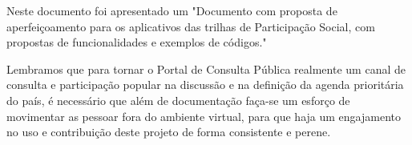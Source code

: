 \documentclass[12pt]{article}
\newcommand{\ProductDescription}{"Documento com proposta de aperfeiçoamento
  para os aplicativos das trilhas de Participação Social, com propostas de
  funcionalidades e exemplos de códigos."
}
\begin{document}
Neste documento foi apresentado um \ProductDescription

Lembramos que para tornar o Portal de Consulta Pública realmente um canal de
consulta e participação popular na discussão e na definição da agenda
prioritária do país, é necessário que além de documentação faça-se um esforço
de movimentar as pessoar fora do ambiente virtual, para que haja um
engajamento no uso e contribuição deste projeto de forma consistente e perene.

\newpage

\newpage
\listoffigures
\newpage
\printindex
\newpage

%
\end{document}
